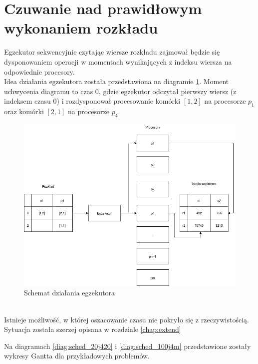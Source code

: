 \documentclass[brudnopis]{xmgr}
\begin{document}
\section{Czuwanie nad prawidłowym wykonaniem rozkładu}

Egzekutor sekwencyjnie czytając wiersze rozkładu zajmował będzie się dysponowaniem operacji w momentach wynikających z indeksu wiersza na odpowiednie procesory.
\medskip\\

Idea działania egzekutora została przedstawiona na diagramie \ref{diag:executor}. Moment uchwycenia diagramu 
to czas 0, gdzie egzekutor odczytał pierwszy wiersz (z indeksem czasu 0) i rozdysponował procesowanie komórki $[1,2]$ na procesorze $p_1$ oraz komórki $[2,1]$ na procesorze $p_4$.
\medskip\\

\begin{figure}[!tbh]
\centering
\includegraphics[width=.8\hsize]{fig/executor.png}
\caption{Schemat działania egzekutora\label{diag:executor}}
\end{figure}
\medskip\\

Istnieje możliwość, w której oszacowanie czasu nie pokryło się z rzeczywistością. Sytuacja została szerzej opisana w rozdziale \ref{chap:extend}

Na diagramach \ref{diag:sched_20j420} i \ref{diag:sched_100j4m} przedstawione zostały wykresy Gantta dla przykładowych problemów.
\end{document}
